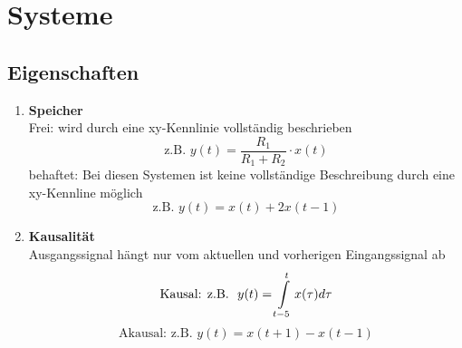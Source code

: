 \section{Systeme}
\subsection{Eigenschaften}
\begin{enumerate}
  \item{\textbf{Speicher}}\\
          \bulletpt Frei: wird durch eine xy-Kennlinie vollständig
          beschrieben
          \[
              \text{z.B. \ }y(t)=\frac{R_1}{R_1+R_2}\cdot x(t)
          \]
          \bulletpt behaftet: Bei diesen Systemen ist keine
          vollständige Beschreibung durch eine xy-Kennline möglich
          \[
              \text{z.B. \ }y(t) = x(t)+2x(t-1)
          \]
  \item{\textbf{Kausalit\"at}}\\
           Ausgangssignal hängt nur vom aktuellen und vorherigen
           Eingangssignal ab
          \[
              \text{Kausal: z.B. \ }y(t) =
              \int\displaylimits_{t-5}^{t}x(\tau)d\tau
          \]
          \[
              \text{Akausal: z.B. \ }y(t) = x(t+1)-x(t-1)
          \]


\end{enumerate}
